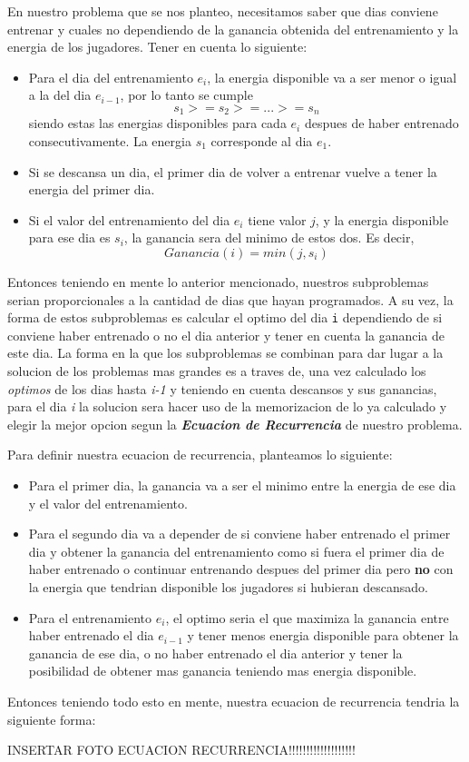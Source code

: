 En nuestro problema que se nos planteo, necesitamos saber que dias conviene entrenar y cuales no dependiendo de la ganancia obtenida del entrenamiento y la energia de los jugadores. Tener en cuenta lo siguiente:
\begin{itemize}
    \item Para el dia del entrenamiento $e_i$, la energia disponible va a ser menor o igual a la del dia $e_{i-1}$, por lo tanto se cumple
    \[ s_1 >= s_2 >= ... >= s_n \]
    siendo estas las energias disponibles para cada $e_i$ despues de haber entrenado consecutivamente. La energia $s_1$ corresponde al dia $e_1$.
    \item Si se descansa un dia, el primer dia de volver a entrenar vuelve a tener la energia del primer dia.
    \item Si el valor del entrenamiento del dia $e_i$ tiene valor $j$, y la energia disponible para ese dia es $s_i$, la ganancia sera del minimo de estos dos. Es decir,
    \[ Ganancia(i) = min(j, s_i) \]
\end{itemize}
Entonces teniendo en mente lo anterior mencionado, nuestros subproblemas serian proporcionales a la cantidad de dias que hayan programados. A su vez, la forma de estos subproblemas es calcular el optimo del dia \texttt{i} dependiendo de si conviene haber entrenado o no el dia anterior y tener en cuenta la ganancia de este dia. La forma en la que los subproblemas se combinan para dar lugar a la solucion de los problemas mas grandes es a traves de, una vez calculado los \textit{optimos} de los dias hasta \textit{i-1} y teniendo en cuenta descansos y sus ganancias, para el dia \textit{i} la solucion sera hacer uso de la memorizacion de lo ya calculado y elegir la mejor opcion segun la \textbf{\textit{Ecuacion de Recurrencia}} de nuestro problema.

Para definir nuestra ecuacion de recurrencia, planteamos lo siguiente:
\begin{itemize}
    \item Para el primer dia, la ganancia va a ser el minimo entre la energia de ese dia y el valor del entrenamiento.
    \item Para el segundo dia va a depender de si conviene haber entrenado el primer dia y obtener la ganancia del entrenamiento como si fuera el primer dia de haber entrenado o continuar entrenando despues del primer dia pero \textbf{no} con la energia que tendrian disponible los jugadores si hubieran descansado.
    \item Para el entrenamiento $e_i$, el optimo seria el que maximiza la ganancia entre haber entrenado el dia $e_{i-1}$ y tener menos energia disponible para obtener la ganancia de ese dia, o no haber entrenado el dia anterior y tener la posibilidad de obtener mas ganancia teniendo mas energia disponible.
\end{itemize}
Entonces teniendo todo esto en mente, nuestra ecuacion de recurrencia tendria la siguiente forma:

INSERTAR FOTO ECUACION RECURRENCIA!!!!!!!!!!!!!!!!!!!

